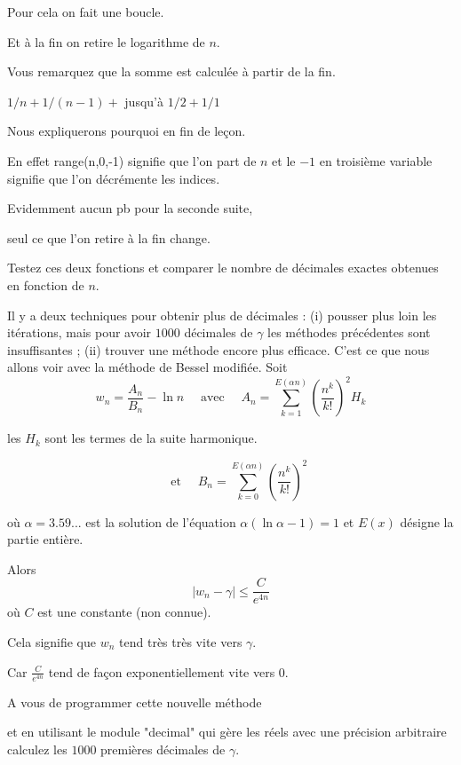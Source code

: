 Pour cela on fait une boucle.

Et à la fin on retire le logarithme de $n$.


Vous remarquez que la somme est calculée à partir de la fin. 

 
$1/n + 1/(n-1) +$   jusqu'à $1/2 + 1/1$

 Nous expliquerons pourquoi en fin de leçon.
 
En effet range(n,0,-1) signifie que l'on part de $n$ et le $-1$ en troisième variable
signifie que l'on décrémente les indices.


\change


Evidemment aucun pb pour la seconde suite,

seul ce que l'on retire à la fin change.
 
Testez ces deux fonctions et comparer le nombre de décimales exactes obtenues en fonction de $n$.


\diapo

Il y a deux techniques pour obtenir plus de décimales : (i) pousser plus loin les itérations,
mais pour avoir $1000$ décimales de $\gamma$ les méthodes précédentes sont insuffisantes ; 
(ii) trouver une méthode encore plus efficace. C'est ce que nous allons voir avec
la méthode de Bessel modifiée.
Soit 
$$w_n = \frac{A_n}{B_n} - \ln n 
\quad \text{ avec } \quad
A_n =\sum_{k=1}^{E(\alpha n)} \left( \frac{n^k}{k!} \right)^2 H_k$$

les $H_k$ sont les termes de la suite harmonique.

$$
 \quad \text{ et } \quad 
B_n =\sum_{k=0}^{E(\alpha n)} \left( \frac{n^k}{k!} \right)^2 
$$


\change
où $\alpha = 3.59...$ est la solution de l'équation $\alpha(\ln \alpha - 1)=1$ et
$E(x)$ désigne la partie entière.


\change

Alors 
$$|w_n - \gamma| \le \frac{C}{e^{4n}}$$
où $C$ est une constante (non connue).

Cela signifie que $w_n$ tend très très vite vers $\gamma$.

Car $\frac{C}{e^{4n}}$ tend de façon exponentiellement vite vers $0$.

\change

A vous de programmer cette nouvelle méthode

et en utilisant le module "decimal" qui gère les réels avec une précision arbitraire
calculez les $1000$ premières décimales de $\gamma$.


